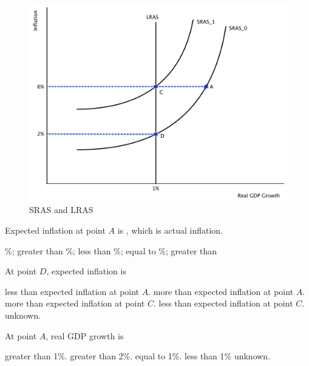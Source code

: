 \documentclass[addpoints,11pt]{exam}
\theoremstyle{definition}
\newcommand{\blank}[0]{\underline{\hspace{3cm}}}
\begin{document}
\begin{questions}
\begin{figure}[H]
	\centering
	\includegraphics[scale=.40]{final_32.pdf}
	\caption{SRAS and LRAS}
	\label{fig5}
\end{figure}



\newpage

\question \label{qblah} Expected inflation at point $A$ is \blank, which is \blank actual inflation.

\begin{choices}
	\%; greater than
	\%; less than
	\%; equal to
	\%; greater than
\end{choices}

\question At point $D$, expected inflation is 

\begin{choices}
	\choice less than expected inflation at point $A$.
	\choice more than expected inflation at point $A$.
	\choice more than expected inflation at point $C$.
	\CorrectChoice less than expected inflation at point $C$.
	\choice unknown.
\end{choices}

\question \label{qblah2} At point $A$, real GDP growth is

\begin{choices}
	\CorrectChoice greater than 1\%.
	\choice greater than 2\%.
	\choice equal to 1\%.
	\choice less than 1\%
	\choice unknown.
\end{choices}



\end{questions}
\end{document}
